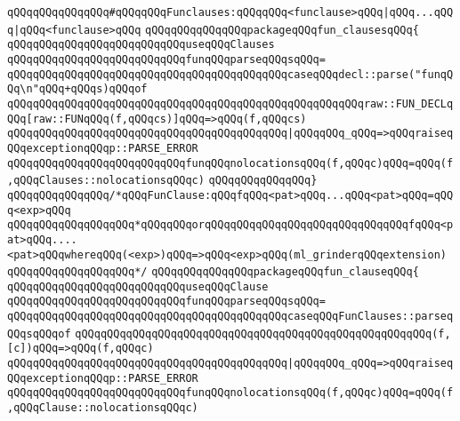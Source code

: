 \newline
\verb|qQQqqQQqqQQqqQQq#qQQqqQQqFunclauses:qQQqqQQq<funclause>qQQq|\verb#|qQQq...qQQq|qQQq<funclause>qQQq#\newline
\verb|qQQqqQQqqQQqqQQqpackageqQQqfun_clausesqQQq{|\newline
\newline
\verb|qQQqqQQqqQQqqQQqqQQqqQQqqQQquseqQQqClauses|\newline
\verb|qQQqqQQqqQQqqQQqqQQqqQQqqQQqfunqQQqparseqQQqsqQQq=|\newline
\verb|qQQqqQQqqQQqqQQqqQQqqQQqqQQqqQQqqQQqqQQqqQQqcaseqQQqdecl::parse("funqQQq\n"qQQq+qQQqs)qQQqof|\newline
\verb|qQQqqQQqqQQqqQQqqQQqqQQqqQQqqQQqqQQqqQQqqQQqqQQqqQQqqQQqraw::FUN_DECLqQQq[raw::FUNqQQq(f,qQQqcs)]qQQq=>qQQq(f,qQQqcs)|\newline
\verb|qQQqqQQqqQQqqQQqqQQqqQQqqQQqqQQqqQQqqQQqqQQq|\verb#|qQQqqQQq_qQQq=>qQQqraiseqQQqexceptionqQQqp::PARSE_ERROR#\newline
\verb|qQQqqQQqqQQqqQQqqQQqqQQqqQQqfunqQQqnolocationsqQQq(f,qQQqc)qQQq=qQQq(f,qQQqClauses::nolocationsqQQqc)|\newline
\verb|qQQqqQQqqQQqqQQq}|\newline
\newline
\verb|qQQqqQQqqQQqqQQq/*qQQqFunClause:qQQqfqQQq<pat>qQQq...qQQq<pat>qQQq=qQQq<exp>qQQq|\newline
\verb|qQQqqQQqqQQqqQQqqQQq*qQQqqQQqorqQQqqQQqqQQqqQQqqQQqqQQqqQQqqQQqfqQQq<pat>qQQq....<pat>qQQqwhereqQQq(<exp>)qQQq=>qQQq<exp>qQQq(ml_grinderqQQqextension)|\newline
\verb|qQQqqQQqqQQqqQQqqQQq*/|\newline
\verb|qQQqqQQqqQQqqQQqpackageqQQqfun_clauseqQQq{|\newline
\newline
\verb|qQQqqQQqqQQqqQQqqQQqqQQqqQQquseqQQqClause|\newline
\verb|qQQqqQQqqQQqqQQqqQQqqQQqqQQqfunqQQqparseqQQqsqQQq=|\newline
\verb|qQQqqQQqqQQqqQQqqQQqqQQqqQQqqQQqqQQqqQQqqQQqcaseqQQqFunClauses::parseqQQqsqQQqof|\newline
\verb|qQQqqQQqqQQqqQQqqQQqqQQqqQQqqQQqqQQqqQQqqQQqqQQqqQQqqQQq(f,[c])qQQq=>qQQq(f,qQQqc)|\newline
\verb|qQQqqQQqqQQqqQQqqQQqqQQqqQQqqQQqqQQqqQQqqQQq|\verb#|qQQqqQQq_qQQq=>qQQqraiseqQQqexceptionqQQqp::PARSE_ERROR#\newline
\verb|qQQqqQQqqQQqqQQqqQQqqQQqqQQqfunqQQqnolocationsqQQq(f,qQQqc)qQQq=qQQq(f,qQQqClause::nolocationsqQQqc)|\newline
